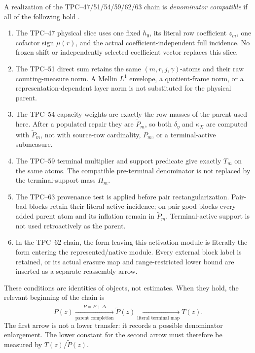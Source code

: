 \begin{definition}
\label{def:tpc64-denominator-compatible-realization}
A realization of the TPC--47/51/54/59/62/63 chain is
\emph{denominator compatible} if all of the following hold
\citep{WangTPC47,WangTPC51,WangTPC54,WangTPC59,WangTPC62,WangTPC63}.
\begin{enumerate}[label=\textup{(D\arabic*)},leftmargin=3.4em]
 \item The TPC--47 physical slice uses one fixed \(h_0\), its literal row
       coefficient \(z_m\), one cofactor sign \(\mu(r)\), and the actual
       coefficient-independent full incidence.  No frozen shift or
       independently selected coefficient vector replaces this slice.
 \item The TPC--51 direct sum retains the same
       \((m,r,j,\gamma)\)-atoms and their raw counting-measure norm.
       A Mellin \(L^1\) envelope, a quotient-frame norm, or a
       representation-dependent layer norm is not substituted for the
       physical parent.
 \item The TPC--54 capacity weights are exactly the row masses of the
       parent used here.  After a populated repair they are
       \(\widetilde P_m\), so both \(\delta_\eta\) and \(\kappa_X\) are
       computed with \(\widetilde P_m\), not with source-row cardinality,
       \(P_m\), or a terminal-active submeasure.
 \item The TPC--59 terminal multiplier and support predicate give exactly
       \(T_m\) on the same atoms.  The compatible pre-terminal
       denominator is not replaced by the terminal-support mass \(H_m\).
 \item The TPC--63 provenance test is applied before pair
       rectangularization.  Pair-bad blocks retain their literal active incidence;
       on pair-good blocks every added parent atom and its inflation remain
       in \(\widetilde P_m\).  Terminal-active support is not used
       retroactively as the parent.
 \item In the TPC--62 chain, the form leaving this activation module is
       literally the form entering the represented/native module.  Every
       external block label is retained, or its actual erasure map and
       range-restricted lower bound are inserted as a separate reassembly
       arrow.
\end{enumerate}
\end{definition}

These conditions are identities of objects, not estimates.  When they
hold, the relevant beginning of the chain is
\begin{equation}
 \boxed{
 P(z)
 \xrightarrow[\text{parent completion}]{\widetilde P=P+\Delta}
 \widetilde P(z)
 \xrightarrow[\text{literal terminal map}]{\quad}
 T(z).}
 \label{eq:tpc64-exact-denominator-chain}
\end{equation}
The first arrow is not a lower transfer: it records a possible
denominator enlargement.  The lower constant for the second arrow must
therefore be measured by \(T(z)/\widetilde P(z)\).

